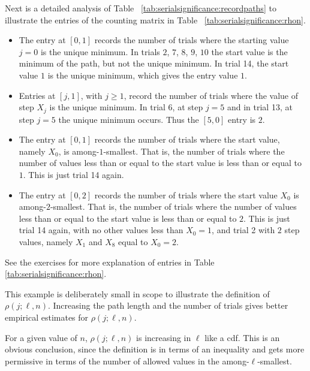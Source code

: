 \documentclass[12pt]{article}
\begin{document}
\begin{example}
    Next is a detailed analysis of Table~%
    \ref{tab:serialsignificance:recordpaths} to illustrate the entries
    of the counting matrix in Table~%
    \ref{tab:serialsignificance:rhon}.
    \begin{itemize}
        \item
            The entry at \( [0,1] \) records the number of trials where
            the starting value \( j=0 \) is the unique minimum.  In
            trials \( 2 \), \( 7 \), \( 8 \), \( 9 \), \( 10 \) the
            start value is the minimum of the path, but not the unique
            minimum. In trial 14, the start value \( 1 \) is the unique
            minimum, which gives the entry value \( 1 \).
        \item
            Entries at \( [j,1] \), with \( j \ge 1 \), record the
            number of trials where the value of step \( X_j \) is the
            unique minimum.  In trial 6, at step \( j=5 \) and in trial
            13, at step \( j = 5 \) the unique minimum occurs. Thus the \(
            [5,0] \) entry is \( 2 \).
        \item
            The entry at \( [0,1] \) records the number of trials where
            the start value, namely \( X_0 \), is among-\( 1 \)-smallest.
            That is, the number of trials where the number of values
            less than or equal to the start value is less than or equal
            to \( 1 \).  This is just trial 14 again.
        \item
            The entry at \( [0,2] \) records the number of trials where
            the start value \( X_0 \) is among-\( 2 \)-smallest.  That
            is, the number of trials where the number of values less
            than or equal to the start value is less than or equal to \(
            2 \).  This is just trial 14 again, with no other values
            less than \( X_0 = 1 \), and trial 2 with \( 2 \) step
            values, namely \( X_1 \) and \( X_8 \) equal to \( X_0 = 2 \).
    \end{itemize}
    See the exercises for more explanation of entries in Table~%
    \ref{tab:serialsignificance:rhon}.

    This example is deliberately small in scope to illustrate the
    definition of \( \rho(j; \ell, n) \).  Increasing the path length
    and the number of trials gives better empirical estimates for \(
    \rho(j; \ell, n) \).
\end{example}

\begin{remark}
    For a given value of \( n \), \( \rho(j; \ell, n) \) is increasing
    in \( \ell \) like a cdf.  This is an obvious conclusion, since the
    definition is in terms of an inequality and gets more permissive in
    terms of the number of allowed values in the among-\( \ell \)-smallest.
\end{remark}
\end{document}

